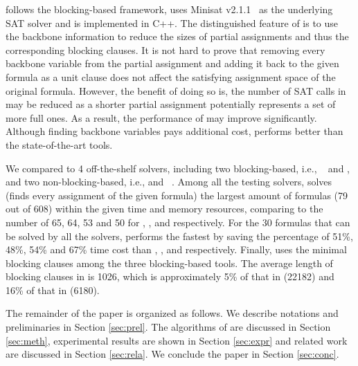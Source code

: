 \tool follows the blocking-based framework, uses Minisat v2.1.1~\cite{minisat} as the underlying SAT solver and is implemented in C++. The distinguished feature of \tool is to use the backbone information to reduce the sizes of partial assignments and thus the corresponding blocking clauses. It is not hard to prove that removing every backbone variable from the partial assignment and adding it back to the given formula as a unit clause does not affect the satisfying assignment space of the original formula. 
However, the benefit of doing so is, the number of SAT calls in \tool may be reduced as a shorter partial assignment potentially represents a set of more full ones. As a result, the performance of \tool may improve significantly. Although finding backbone variables pays additional cost, \tool performs better than the state-of-the-art tools.

We compared \tool to 4 off-the-shelf solvers, including two blocking-based, i.e., \ctool~\cite{ctool} and \bc, and two non-blocking-based, i.e., \nbc and \bdd~\cite{ietool}. Among all the testing solvers, \tool solves (finds every assignment of the given formula) the largest amount of formulas (79 out of 608) within the given time and memory resources, comparing to the number of 65, 64, 53 and 50 for \ctool, \bc, \nbc and \bdd  respectively. 
For the 30 formulas that can be solved by all the solvers, \tool performs the fastest by saving the percentage of 51\%, 48\%, 54\% and 67\% time cost than \ctool, \bc, \nbc and \bdd respectively.
Finally, \tool uses the minimal blocking clauses among the three blocking-based tools. The average length of blocking clauses in \tool is 1026, which is approximately 5\% of that in \ctool (22182) and 16\% of that in \bc (6180). 

The remainder of the paper is organized as follows. We describe notations and preliminaries in Section \ref{sec:prel}. The algorithms of \tool are discussed in Section \ref{sec:meth}, experimental results are shown in Section \ref{sec:expr} and related work are discussed in Section \ref{sec:rela}. We conclude the paper in Section \ref{sec:conc}.

